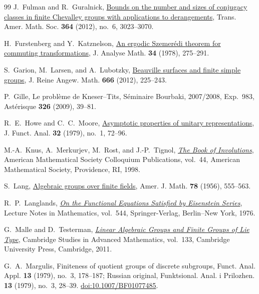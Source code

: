 \begin{thebibliography}{99}
J.~Fulman and R.~Guralnick,
\href{https://doi.org/10.1090/S0002-9947-2012-05427-4}{Bounds on the
number and sizes of conjugacy classes in finite Chevalley groups with
applications to derangements},
Trans. Amer. Math. Soc. \textbf{364} (2012), no.~6, 3023--3070.

H.~Furstenberg and Y.~Katznelson,
\href{https://doi.org/10.1007/BF02790016}{An ergodic Szemer\'edi theorem
for commuting transformations},
J. Analyse Math. \textbf{34} (1978), 275--291.

S.~Garion, M.~Larsen, and A.~Lubotzky,
\href{https://doi.org/10.1515/CRELLE.2011.117}{Beauville surfaces and
finite simple groups},
J. Reine Angew. Math. \textbf{666} (2012), 225--243.

P.~Gille,
Le probl\`eme de Kneser--Tits,
S\'eminaire Bourbaki, 2007/2008, Exp.~983,
Ast\'erisque \textbf{326} (2009), 39--81.

R.~E.~Howe and C.~C.~Moore,
\href{https://doi.org/10.1016/0022-1236(79)90078-8}{Asymptotic
properties of unitary representations},
J. Funct. Anal. \textbf{32} (1979), no.~1, 72--96.

M.-A.~Knus, A.~Merkurjev, M.~Rost, and J.-P.~Tignol,
\emph{\href{https://doi.org/10.1090/coll/044}{The Book of Involutions}},
American Mathematical Society Colloquium Publications, vol.~44,
American Mathematical Society, Providence, RI, 1998.

S.~Lang,
\href{https://wstein.org/papers/bib/Lang-Algebraic_Groups_Over_Finite_Fields.pdf}
{Algebraic groups over finite fields},
Amer. J. Math. \textbf{78} (1956), 555--563.

R.~P.~Langlands,
\emph{\href{https://doi.org/10.1007/BFb0079929}{On the Functional
Equations Satisfied by Eisenstein Series}},
Lecture Notes in Mathematics, vol.~544,
Springer-Verlag, Berlin--New York, 1976.

G.~Malle and D.~Testerman,
\emph{\href{https://doi.org/10.1017/CBO9780511994777}{Linear Algebraic
Groups and Finite Groups of Lie Type}},
Cambridge Studies in Advanced Mathematics, vol.~133,
Cambridge University Press, Cambridge, 2011.

G.~A.~Margulis,
Finiteness of quotient groups of discrete subgroups,
Funct. Anal. Appl. \textbf{13} (1979), no.~3, 178--187;
Russian original, Funktsional. Anal. i Prilozhen.
\textbf{13} (1979), no.~3, 28--39.
\href{https://doi.org/10.1007/BF01077485}{doi:10.1007/BF01077485}.


\end{thebibliography}
